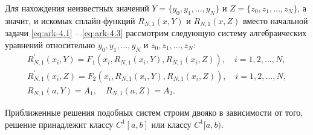 Для нахождения неизвестных значений $Y=\{y_0,y_1, \dots,y_N\}$ и
$Z=\{z_0,z_1, \dots, z_N\}$, а значит, и искомых сплайн-функций $R_{N,1}(x,Y)$
 и $R_{N,1}(x,Z)$  вместо начальной задачи \eqref{eq:ark-4.1} -- \eqref{eq:ark-4.3}
 рассмотрим следующую систему алгебраических уравнений относительно
 $y_0,y_1, \dots,y_N$ и $z_0,z_1, \dots, z_N$:
\begin{gather*}
  R_{N,1}^\prime(x_i,Y)=F_1(x_i, R_{N,1}(x_i,Y),R_{N,1}(x_i,Z)),\quad i=1,2,\dots,N,
  \\
  R_{N,1}^\prime(x_i,Z)=F_2(x_i, R_{N,1}(x_i,Y),R_{N,1}(x_i,Z)),\quad i=1,2,\dots,N,
  \\
  R_{N,1}(a,Y)=A_1,\quad R_{N,1}(a,Z)=A_2.
\end{gather*}

Приближенные решения подобных систем строим двояко в зависимости от того, решение
принадлежит классу $C^1[a,b]$  или классу $C^1[a,b)$.






















